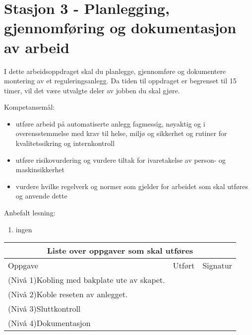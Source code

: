 
\noindent
\section*{Stasjon 3 - Planlegging, gjennomføring  og dokumentasjon  av arbeid}

\vskip 5pt
I dette arbeidsoppdraget skal du planlegge, gjennomføre og dokumentere montering av et reguleringsanlegg. Da tiden til oppdraget er begrenset til 15  timer, vil det være utvalgte deler av jobben du skal gjøre. 

\vskip 5pt 
Kompetansemål:
\begin{itemize}[noitemsep]

	\item utføre arbeid på automatiserte anlegg fagmessig, nøyaktig og i overensstemmelse med krav til helse, miljø og sikkerhet og rutiner for kvalitetssikring og internkontroll
	\item utføre risikovurdering og vurdere tiltak for ivaretakelse av person- og maskinsikkerhet
	\item vurdere hvilke regelverk og normer som gjelder for arbeidet som skal utføres og anvende dette
\end{itemize}

Anbefalt lesning:

\begin{enumerate}
	\item ingen       
\end{enumerate}


\begin{center}
\begin{tabular}{ | m{10cm} | m{1cm}| m{2cm} | } 
\hline
\multicolumn{3}{|c|}{Liste over oppgaver som skal utføres} \\
	\hline
	Oppgave	& Utført & Signatur \\ 
	\hline
	\hline
	\cellcolor{green!60}(Nivå 1)Kobling med bakplate ute av skapet.	& & \\ 
	\hline
	\cellcolor{yellow!60}(Nivå 2)Koble reseten av anlegget. 	& & \\ 
	\hline
	\cellcolor{orange!60}(Nivå 3)Sluttkontroll	& & \\ 
	\hline
	\cellcolor{red!60}(Nivå 4)Dokumentasjon	& & \\ 
	\hline
\end{tabular}
\end{center}

